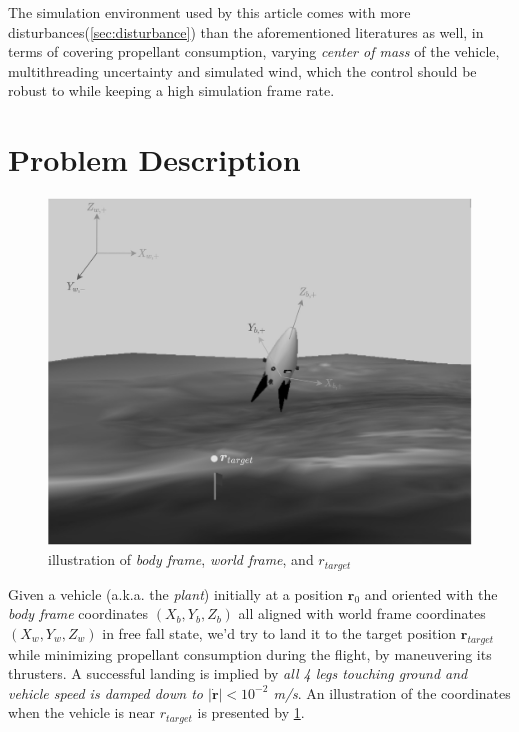 \documentclass[10pt]{elsarticle}
\begin{document}
The simulation environment used by this article comes with more disturbances(\cref{sec:disturbance}) than the aforementioned literatures as well, in terms of covering propellant consumption, varying \textit{center of mass} of the vehicle, multithreading uncertainty and simulated wind, which the control should be robust to while keeping a high simulation frame rate.      

\section{Problem Description} \label{sec:problem} 

\begin{figure}[htb]
    \centering
    \includegraphics[width=.9\textwidth, keepaspectratio]{plant_geometry_1}
    \vspace*{2mm}
    \caption{illustration of \textit{body frame}, \textit{world frame}, and $r_{target}$}
    \label{fig:plant_geometry_1}
\end{figure}

Given a vehicle (a.k.a. the \textit{plant}) initially at a position $\boldsymbol{r}_{0}$ and oriented with the \textit{body frame} coordinates $(X_{b}, Y_{b}, Z_{b})$ all aligned with world frame coordinates $(X_{w}, Y_{w}, Z_{w})$ in free fall state, we'd try to land it to the target position $\boldsymbol{r}_{target}$ while minimizing propellant consumption during the flight, by maneuvering its thrusters. A successful landing is implied by \textit{all 4 legs touching ground and vehicle speed is damped down to $|\dot{\boldsymbol{r}}| < 10^{-2}$ m/s}. An illustration of the coordinates when the vehicle is near $r_{target}$ is presented by \cref{fig:plant_geometry_1}. 
\end{document}
